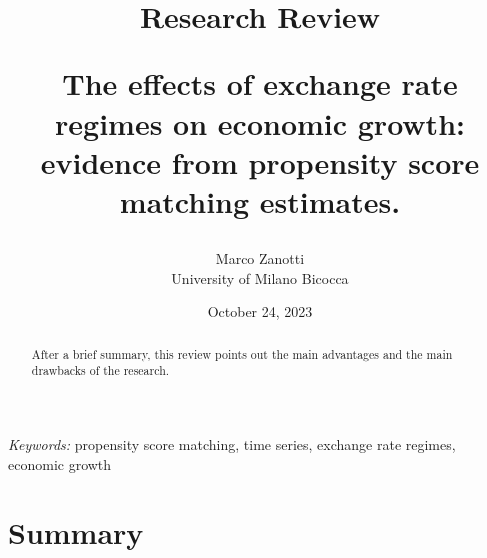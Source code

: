 \documentclass[
  12pt]{article}
\begin{document}
\def\spacingset#1{\renewcommand{\baselinestretch}%
{#1}\small\normalsize} \spacingset{1}



\date{October 24, 2023}
\title{\bf Research Review

The effects of exchange rate regimes on economic growth: evidence from
propensity score matching estimates.}
\author{
Marco Zanotti\\
University of Milano Bicocca\\
}
\maketitle

\bigskip
\bigskip
\begin{abstract}
After a brief summary, this review points out the main advantages and
the main drawbacks of the research.
\end{abstract}

\noindent%
{\it Keywords:} propensity score matching, time series, exchange rate
regimes, economic growth
\vfill

\newpage
\spacingset{1.9} %
\ifdefined\Shaded\renewenvironment{Shaded}{\begin{tcolorbox}[interior hidden, sharp corners, borderline west={3pt}{0pt}{shadecolor}, breakable, enhanced, frame hidden, boxrule=0pt]}{\end{tcolorbox}}\fi

\hypertarget{summary}{%
\section{Summary}\label{summary}}
\end{document}
